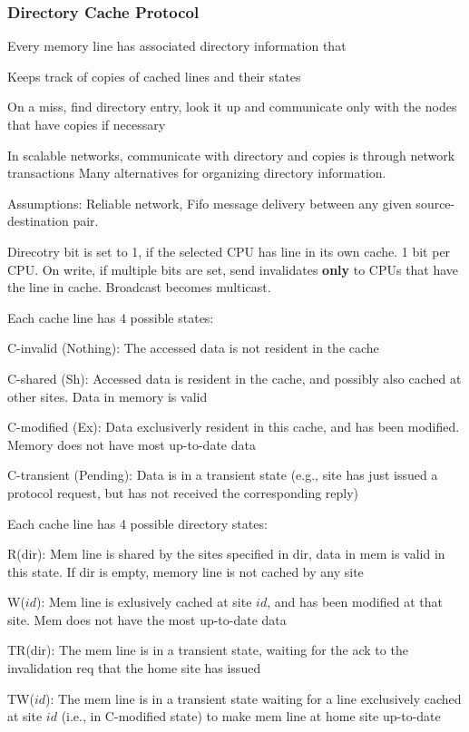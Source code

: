 \documentclass[a4paper, fontsize=8pt, landscape, DIV=1]{scrartcl}
\makeatletter
\renewenvironment{outline}[1][]{%
  \ifthenelse{\equal{#1}{}}{}{\renewcommand{\ol@type}{#1}}%
  \ol@z%
  \newcommand{\0}{\ol@toz\ol@z}%
  \newcommand{\1}{\vspace{\dimexpr\outlinespacingscalar\baselineskip-\baselineskip}\ol@toi\ol@i\item}%
  \newcommand{\2}{\vspace{\dimexpr\outlinespacingscalartwo\baselineskip-\baselineskip}\ol@toii\ol@ii\item}%
  \newcommand{\3}{\vspace{\dimexpr\outlinespacingscalar\baselineskip-\baselineskip}\ol@toiii\ol@iii\item}%
  \newcommand{\4}{\vspace{\dimexpr\outlinespacingscalar\baselineskip-\baselineskip}\ol@toiiii\ol@iiii\item}%
}{%
  \ol@toz\ol@exit%
}
\def\outlinespacingscalar{0.5}
\def\outlinespacingscalartwo{0.5}
\makeatother
\begin{document}
\begin{multicols*}{4}
  \subsubsection{Directory Cache Protocol}
  Every memory line has associated directory information that
  \begin{outline}
    \1 Keeps track of copies of cached lines and their states
    \1 On a miss, find directory entry, look it up and communicate only with the
    nodes that have copies if necessary
    \1 In scalable networks, communicate with directory and copies is through network
    transactions
  \end{outline}
  Many alternatives for organizing directory information.

  Assumptions: Reliable network, Fifo message delivery between any given source-destination
  pair.

  Direcotry bit is set to 1, if the selected CPU has line in its own cache. 1 bit per CPU.
  On write, if multiple bits are set, send invalidates \textbf{only} to CPUs that have
  the line in cache. Broadcast becomes multicast. 

  Each cache line has 4 possible states:  
  \begin{outline}
    \1 C-invalid (Nothing): The accessed data is not resident in the cache
    \1 C-shared (Sh): Accessed data is resident in the cache, and possibly also cached at
    other sites. Data in memory is valid
    \1 C-modified (Ex): Data exclusiverly resident in this cache, and has been modified. Memory
    does not have most up-to-date data
    \1 C-transient (Pending): Data is in a transient state (e.g., site has just issued a
    protocol request, but has not received the corresponding reply)
  \end{outline}

  Each cache line has 4 possible directory states:
  \begin{outline}
    \1 R(dir): Mem line is shared by the sites specified in dir, data in mem is valid
    in this state. If dir is empty, memory line is not cached by any site
    \1 W($id$): Mem line is exlusively cached at site $id$, and has been modified at that
    site. Mem does not have the most up-to-date data
    \1 TR(dir): The mem line is in a transient state, waiting for the ack to the invalidation req 
    that the home site has issued
    \1 TW($id$): The mem line is in a transient state waiting for a line exclusively cached at site
    $id$ (i.e., in C-modified state) to make mem line at home site up-to-date
  \end{outline}


\end{multicols*}
\end{document}

